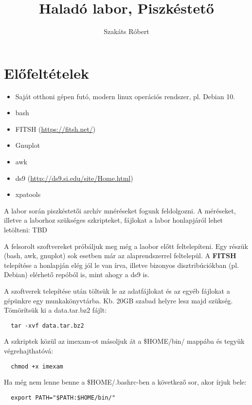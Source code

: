 \documentclass{article}
\begin{document}
\title{Haladó labor, Piszkéstető}
\author{Szakáts Róbert}

\maketitle

\section{Előfeltételek}

\begin{itemize}
  \item Saját otthoni gépen futó, modern linux operációs rendszer, pl. Debian 10.
  \item bash
  \item FITSH (\url{https://fitsh.net/})
  \item Gnuplot
  \item awk
  \item ds9 (\url{http://ds9.si.edu/site/Home.html})
  \item xpatools
\end{itemize}

A labor során piszkéstetői archív mnéréseket fogunk feldolgozni. A méréseket,
illetve a laborhoz szükséges szkripteket, fájlokat a labor honlapjáról lehet
letölteni: TBD

A felsorolt szoftvereket próbáljuk meg még a laobor előtt feltelepíteni.
Egy részük (bash, awk, gnuplot) sok esetben már az alaprendszerrel feltelepül.
A {\bf{FITSH}} telepítése a honlapján elég jól le van írva, illetve bizonyos
disztribúciókban (pl. Debian) elérhető repóból is, mint ahogy a ds9 is.

A szoftverek telepítése után töltsük le az adatfájlokat és az egyéb fájlokat a
gépünkre egy munkakönyvtárba. Kb. 20GB szabad helyre lesz majd szükség.
Tömörítsük ki a data.tar.bz2 fájlt:
\begin{verbatim}
  tar -xvf data.tar.bz2
\end{verbatim}

A szkriptek közül az imexam-ot másoljuk át a \$HOME/bin/ mappába és tegyük
végrehajthatóvá:
\begin{verbatim}
  chmod +x imexam
\end{verbatim}

Ha még nem lenne benne a \$HOME/.bashrc-ben a következő sor, akor írjuk bele:
\begin{verbatim}
  export PATH="$PATH:$HOME/bin/"
\end{verbatim}
\end{document}
